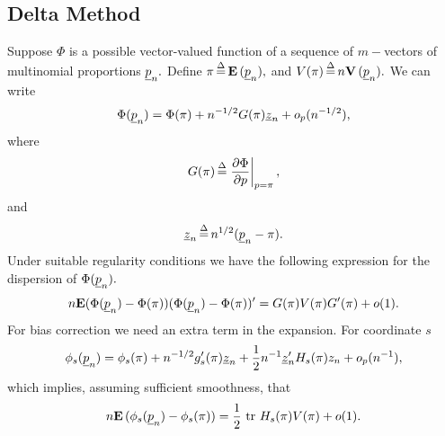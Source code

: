 \documentclass{amsart}
\theoremstyle{definition}
\theoremstyle{remark}
\numberwithin{equation}{section}
\begin{document}
\subsection{Delta Method}
%
Suppose $\Phi$ is a
possible vector-valued function of a sequence of $m-$vectors of
multinomial proportions $\underline p_n.$ Define
$\pi\mathop{=}\limits^{\Delta}{\bf E}\,(\underline p_n),$ and $V(\pi)\mathop{=}\limits^{\Delta} n{\bf V}\,(\underline p_n).$ We can write
\begin{equation}
\Phi(\underline p_n)=\Phi(\pi)+n^{-1/2}G(\pi)\underline z_n+o_p(n^{-1/2}),
\end{equation}
where
\begin{equation}
G(\pi)\mathop{=}\limits^{\Delta}\left. \frac{\partial\Phi}{\partial p}\right|_{p=\pi},
\end{equation}
and
\begin{equation}
\underline z_n\mathop{=}\limits^{\Delta} n^{1/2}(\underline p_n-\pi).
\end{equation}
Under suitable regularity conditions we have the following expression
for the dispersion of $\Phi(\underline p_n).$ 
\begin{equation}
n\textbf{E}(\Phi(\underline p_n)-\Phi(\pi))(\Phi(\underline p_n)-\Phi(\pi))'=
G(\pi)V(\pi)G'(\pi)+o(1).
\end{equation}
%
For bias correction we need an extra term in the expansion. For 
coordinate $s$
\begin{equation}
\phi_s(\underline p_n)=\phi_s(\pi)+n^{-1/2}g_s'(\pi)\underline z_n+
\frac{1}{2}n^{-1}\underline z_n'H_s(\pi)z_n+o_p(n^{-1}),
\end{equation}
which implies, assuming sufficient smoothness, that
\begin{equation}
n{\bf E}\,(\phi_s(\underline p_n)-\phi_s(\pi))=\frac{1}{2}\text{ tr }H_s(\pi)V(\pi)+o(1).
\end{equation}
%
\end{document}
